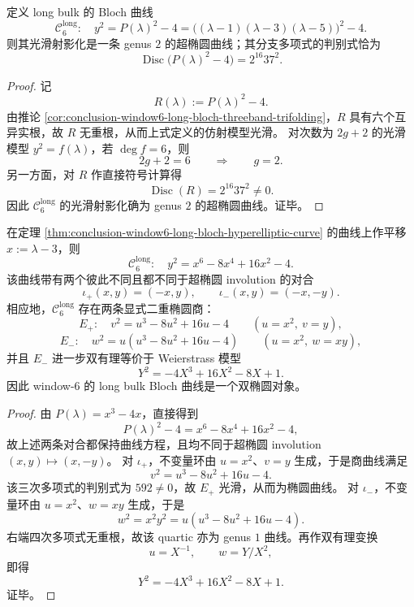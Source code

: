 \begin{theorem}\label{thm:conclusion-window6-long-bloch-hyperelliptic-curve}
定义 long bulk 的 Bloch 曲线
\[
\mathcal C_6^{\mathrm{long}}:\quad
y^2=P(\lambda)^2-4
=\bigl((\lambda-1)(\lambda-3)(\lambda-5)\bigr)^2-4.
\]
则其光滑射影化是一条 genus \(2\) 的超椭圆曲线；其分支多项式的判别式恰为
\[
\operatorname{Disc}\bigl(P(\lambda)^2-4\bigr)=2^{16}37^2.
\]
\end{theorem}
\begin{proof}
记
\[
R(\lambda):=P(\lambda)^2-4.
\]
由推论 \ref{cor:conclusion-window6-long-bloch-threeband-trifolding}，\(R\) 具有六个互异实根，故 \(R\) 无重根，从而上式定义的仿射模型光滑。
对次数为 \(2g+2\) 的光滑模型 \(y^2=f(\lambda)\)，若 \(\deg f=6\)，则
\[
2g+2=6\qquad\Longrightarrow\qquad g=2.
\]
另一方面，对 \(R\) 作直接符号计算得
\[
\operatorname{Disc}(R)=2^{16}37^2\neq 0.
\]
因此 \(\mathcal C_6^{\mathrm{long}}\) 的光滑射影化确为 genus \(2\) 的超椭圆曲线。证毕。
\end{proof}

\begin{corollary}\label{cor:conclusion-window6-long-bloch-bielliptic-quotients}
在定理 \ref{thm:conclusion-window6-long-bloch-hyperelliptic-curve} 的曲线上作平移 \(x:=\lambda-3\)，则
\[
\mathcal C_6^{\mathrm{long}}:\quad y^2=x^6-8x^4+16x^2-4.
\]
该曲线带有两个彼此不同且都不同于超椭圆 involution 的对合
\[
\iota_+(x,y)=(-x,y),
\qquad
\iota_-(x,y)=(-x,-y).
\]
相应地，\(\mathcal C_6^{\mathrm{long}}\) 存在两条显式二重椭圆商：
\[
E_+:\quad v^2=u^3-8u^2+16u-4
\qquad (u=x^2,\ v=y),
\]
\[
E_-:\quad w^2=u(u^3-8u^2+16u-4)
\qquad (u=x^2,\ w=xy),
\]
并且 \(E_-\) 进一步双有理等价于 Weierstrass 模型
\[
Y^2=-4X^3+16X^2-8X+1.
\]
因此 window-\(6\) 的 long bulk Bloch 曲线是一个双椭圆对象。
\end{corollary}
\begin{proof}
由 \(P(\lambda)=x^3-4x\)，直接得到
\[
P(\lambda)^2-4=x^6-8x^4+16x^2-4,
\]
故上述两条对合都保持曲线方程，且均不同于超椭圆 involution \((x,y)\mapsto (x,-y)\)。
对 \(\iota_+\)，不变量环由 \(u=x^2\)、\(v=y\) 生成，于是商曲线满足
\[
v^2=u^3-8u^2+16u-4.
\]
该三次多项式的判别式为 \(592\neq 0\)，故 \(E_+\) 光滑，从而为椭圆曲线。
对 \(\iota_-\)，不变量环由 \(u=x^2\)、\(w=xy\) 生成，于是
\[
w^2=x^2y^2=u(u^3-8u^2+16u-4).
\]
右端四次多项式无重根，故该 quartic 亦为 genus \(1\) 曲线。再作双有理变换
\[
u=X^{-1},
\qquad
w=Y/X^2,
\]
即得
\[
Y^2=-4X^3+16X^2-8X+1.
\]
证毕。
\end{proof}

